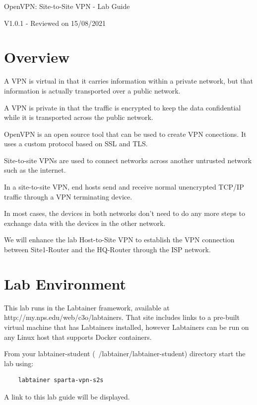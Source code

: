 


\begin{center}
{\LARGE OpenVPN: Site-to-Site VPN - Lab Guide}

V1.0.1 - Reviewed on 15/08/2021
\vspace{0.1in}\\
\end{center}

\copyrightnotice

\section{Overview}
A VPN is virtual in that it carries information within a private network, but that information is actually transported over a public network.

A VPN is private in that the traffic is encrypted to keep the data confidential while it is transported across the public network.

OpenVPN is an open source tool that can be used to create VPN conections. It uses a custom protocol based on SSL and TLS.

Site-to-site VPNs are used to connect networks across another untrusted network such as the internet.

In a site-to-site VPN, end hosts send and receive normal unencrypted TCP/IP traffic through a VPN terminating device.

In most cases, the devices in both networks don't need to do any more steps to exchange data with the devices in the other network.

We will enhance the lab Host-to-Site VPN to establish the VPN connection between Site1-Router and the HQ-Router through the ISP network.

\section{Lab Environment}
This lab runs in the Labtainer framework,
available at http://my.nps.edu/web/c3o/labtainers.
That site includes links to a pre-built virtual machine
that has Labtainers installed, however Labtainers can
be run on any Linux host that supports Docker containers.

From your labtainer-student (~/labtainer/labtainer-student) directory start the lab using:
\begin{verbatim}
    labtainer sparta-vpn-s2s
\end{verbatim}
\noindent A link to this lab guide will be displayed.

